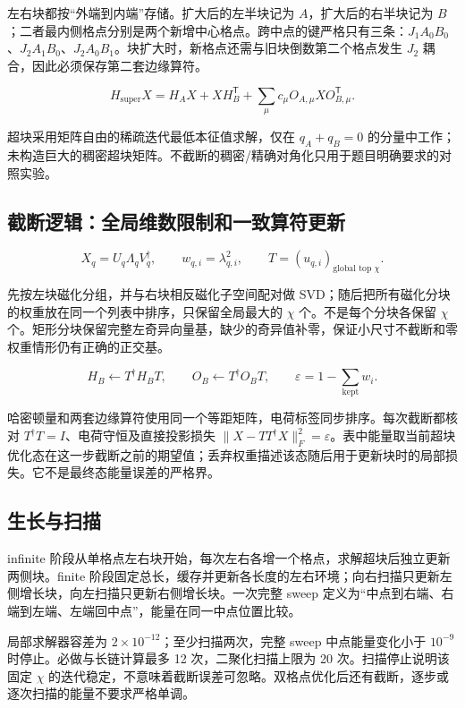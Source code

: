 \documentclass[zihao=5,a4paper]{ctexart}
\begin{document}
左右块都按“外端到内端”存储。扩大后的左半块记为 $A$，扩大后的右半块记为 $B$；二者最内侧格点分别是两个新增中心格点。跨中点的键严格只有三条：$J_1 A_0B_0$、$J_2 A_1B_0$、$J_2 A_0B_1$。块扩大时，新格点还需与旧块倒数第二个格点发生 $J_2$ 耦合，因此必须保存第二套边缘算符。


\[
H_{\mathrm{super}}X=H_AX+XH_B^{\mathsf T}+\sum_{\mu}c_\mu O_{A,\mu}X O_{B,\mu}^{\mathsf T}.
\]

超块采用矩阵自由的稀疏迭代最低本征值求解，仅在 $q_A+q_B=0$ 的分量中工作；未构造巨大的稠密超块矩阵。不截断的稠密/精确对角化只用于题目明确要求的对照实验。


\subsection{\texorpdfstring{截断逻辑：全局维数限制和一致算符更新}{截断逻辑：全局维数限制和一致算符更新}}

\[
X_q=U_q\Lambda_q V_q^\dagger,\qquad w_{q,i}=\lambda_{q,i}^2,\qquad T=(u_{q,i})_{\text{global top }\chi}.
\]

先按左块磁化分组，并与右块相反磁化子空间配对做 SVD；随后把所有磁化分块的权重放在同一个列表中排序，只保留全局最大的 $\chi$ 个。不是每个分块各保留 $\chi$ 个。矩形分块保留完整左奇异向量基，缺少的奇异值补零，保证小尺寸不截断和零权重情形仍有正确的正交基。


\[
H_B\longleftarrow T^\dagger H_BT,\qquad O_B\longleftarrow T^\dagger O_BT,\qquad \varepsilon=1-\sum_{\mathrm{kept}}w_i.
\]

哈密顿量和两套边缘算符使用同一个等距矩阵，电荷标签同步排序。每次截断都核对 $T^\dagger T=I$、电荷守恒及直接投影损失 $\|X-TT^\dagger X\|_F^2=\varepsilon$。表中能量取当前超块优化态在这一步截断之前的期望值；丢弃权重描述该态随后用于更新块时的局部损失。它不是最终态能量误差的严格界。


\subsection{\texorpdfstring{生长与扫描}{生长与扫描}}

infinite 阶段从单格点左右块开始，每次左右各增一个格点，求解超块后独立更新两侧块。finite 阶段固定总长，缓存并更新各长度的左右环境；向右扫描只更新左侧增长块，向左扫描只更新右侧增长块。一次完整 sweep 定义为“中点到右端、右端到左端、左端回中点”，能量在同一中点位置比较。


局部求解器容差为 $2\times10^{-12}$；至少扫描两次，完整 sweep 中点能量变化小于 $10^{-9}$ 时停止。必做与长链计算最多 12 次，二聚化扫描上限为 20 次。扫描停止说明该固定 $\chi$ 的迭代稳定，不意味着截断误差可忽略。双格点优化后还有截断，逐步或逐次扫描的能量不要求严格单调。
\end{document}
